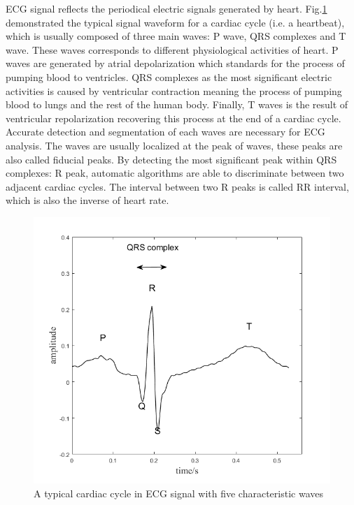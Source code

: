 ECG signal reflects the periodical electric signals generated by heart. Fig.\ref{fig:cardiac_cycle} demonstrated the typical signal waveform for a cardiac cycle (i.e. a heartbeat), which is usually composed of three main waves: P wave, QRS complexes and T wave. These waves corresponds to different physiological activities of heart. P waves are generated by atrial depolarization which standards for the process of pumping blood to ventricles. QRS complexes as the most significant electric activities is caused by ventricular contraction meaning the process of pumping blood to lungs and the rest of the human body. Finally, T waves is the result of ventricular repolarization recovering this process at the end of a cardiac cycle. Accurate detection and segmentation of each waves are necessary for ECG analysis. The waves are usually localized at the peak of waves, these peaks are also called fiducial peaks. By detecting the most significant peak within QRS complexes: R peak, automatic algorithms are able to discriminate between two adjacent cardiac cycles. The interval between two R peaks is called RR interval, which is also the inverse of heart rate.

 \begin{figure}[t]
 	\centering
 	\includegraphics[scale=0.75]{Fig/cardiac_cycle.png}
 	\caption{A typical cardiac cycle in ECG signal with five characteristic waves}
 	\label{fig:cardiac_cycle}
 \end{figure}

